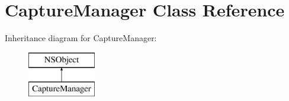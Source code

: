\hypertarget{interface_capture_manager}{}\section{Capture\+Manager Class Reference}
\label{interface_capture_manager}
Inheritance diagram for Capture\+Manager\+:\begin{figure}[H]
\begin{center}
\leavevmode
\includegraphics[height=2.000000cm]{interface_capture_manager}
\end{center}
\end{figure}
